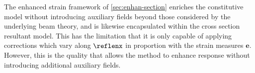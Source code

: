 The enhanced strain framework of \cref{sec:enhan-section} enriches the constitutive model without introducing auxiliary fields beyond those considered by the underlying beam theory, and is likewise encapsulated within the cross section resultant model. 
This has the limitation that it is only capable of applying corrections which vary along \(\reflenx\) in proportion with the strain measures \(\bm{e}\). 
However, this is the quality that allows the method to enhance response without introducing additional auxiliary fields. 

